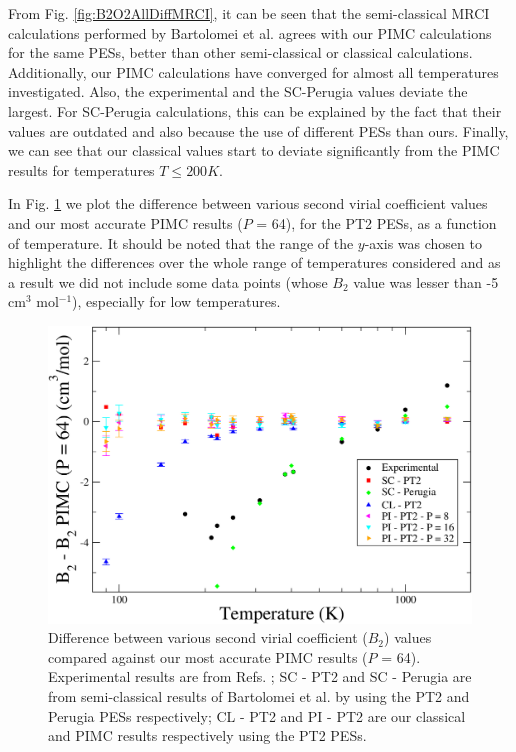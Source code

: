     From Fig. \ref{fig:B2O2AllDiffMRCI}, it can be seen that the semi-classical MRCI calculations performed by Bartolomei et al. \cite{Bartolomei2010} agrees with our PIMC calculations for the same PESs, better than other semi-classical or classical calculations. Additionally, our PIMC calculations have converged for almost all temperatures investigated. Also, the experimental and the SC-Perugia values deviate the largest. For SC-Perugia calculations, this can be explained by the fact that their values are outdated and also because the use of different PESs than ours. Finally, we can see that our classical values start to deviate significantly from the PIMC results for temperatures $T \le 200K$.
    
    In Fig. \ref{fig:B2O2AllDiffPT2} we plot the difference between various second virial coefficient values and our most accurate PIMC results ($P$ = 64), for the PT2 PESs, as a function of temperature. It should be noted that the range of the $y$-axis was chosen to highlight the differences over the whole range of temperatures considered and as a result we did not include some data points (whose $B_2$ value was lesser than -5 cm$^3$ mol$^{-1}$), especially for low temperatures. 
    \begin{figure}[!htbp]
        \centering
        \includegraphics[scale=0.20,keepaspectratio]{Chapter-6/Figures/B2O2AllDiffPT2.png}
        \caption{Difference between various second virial coefficient ($B_2$) values compared against our most accurate PIMC results ($P$ = 64). Experimental results are from Refs. \cite{Bartolomei2010,Dymond}; SC - PT2 and SC - Perugia are from semi-classical results of Bartolomei et al. \cite{Bartolomei2010} by using the PT2 and Perugia PESs \cite{Aquilanti1999} respectively; CL - PT2 and PI - PT2 are our classical and PIMC results respectively using the PT2 PESs.}
        \label{fig:B2O2AllDiffPT2}
    \end{figure}

